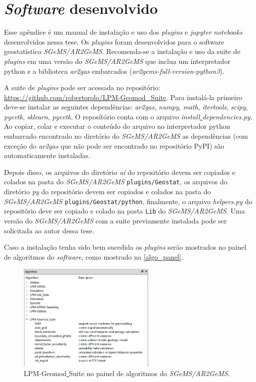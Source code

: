 \chapter{\textit{Software} desenvolvido} \label{software}

Esse apêndice é um manual de instalação e uso dos \textit{plugins} e \textit{jupyter notebooks} desenvolvidos nessa tese. Os \textit{plugins} foram desenvolvidos para o software geostatístico \textit{SGeMS/AR2GeMS}. Recomenda-se a instalação e uso da suite de \textit{plugins} em uma versão do \textit{SGeMS/AR2GeMS} que inclua um interpretador python e a biblioteca \textit{ar2gas} embarcados (\textit{ar2gems-full-version-python3}).

A suite de \textit{plugins} pode ser acessada no repositório: \url{https://github.com/robertorolo/LPM-Geomod_Suite}. Para instalá-la primeiro deve-se instalar as seguintes dependências: \textit{ar2gas}, \textit{numpy}, \textit{math}, \textit{itertools}, \textit{scipy}, \textit{pyevtk}, \textit{sklearn}, \textit{pyevtk}. O reposítório conta com o arquivo \textit{install\underline{ }dependencies.py}. Ao copiar, colar e executar o conteúdo do arquivo no interpretador python embarcado encontrado no diretório do \textit{SGeMS/AR2GeMS} as dependências (com exceção do \textit{ar2gas} que não pode ser encontrado no repositório PyPI) são automaticamente instaladas.

Depois disso, os arquivos do diretório \textit{ui} do repositório devem ser copiados e colados na pasta do \textit{SGeMS/AR2GeMS} \texttt{plugins/Geostat}, os arquivos do diretório \textit{py} do repositório devem ser copiados e colados na pasta do \textit{SGeMS/AR2GeMS} \texttt{plugins/Geostat/python}, finalmente, o arquivo \textit{helpers.py} do repositório deve ser copiado e colado na pasta \texttt{Lib} do \textit{SGeMS/AR2GeMS}. Uma versão do \textit{SGeMS/AR2GeMS} com a suite previamente instalada pode ser solicitada ao autor dessa tese.

Caso a instalação tenha sido bem sucedida os \textit{plugins} serão mostrados no painel de algoritmos do \textit{software}, como mostrado na \autoref{algo_panel}.

\begin{figure}[H]
	\caption{\label{algo_panel} LPM-Geomod\underline{ }Suite no painel de algoritmos do \textit{SGeMS/AR2GeMS}.}
	\centering
		\includegraphics[width=0.6\textwidth]{apendice_a/imagens/algorithms.PNG}
\end{figure}

